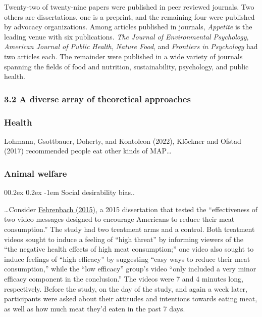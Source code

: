 \documentclass[
  man]{apa6}
\makeatletter
\let\oldparagraph\paragraph
\renewcommand{\paragraph}[1]{\oldparagraph{#1}\mbox{}}
\renewcommand{\paragraph}{\@startsection{paragraph}{4}{\parindent}%
  {0\baselineskip \@plus 0.2ex \@minus 0.2ex}%
  {-1em}%
  {\normalfont\normalsize\bfseries\itshape\typesectitle}}
\makeatother
\begin{document}
Twenty-two of twenty-nine papers were published in peer reviewed journals. Two others are dissertations, one is a preprint, and the remaining four were published by advocacy organizations. Among articles published in journals, \emph{Appetite} is the leading venue with six publications. \emph{The Journal of Environmental Psychology}, \emph{American Journal of Public Health}, \emph{Nature Food}, and \emph{Frontiers in Psychology} had two articles each. The remainder were published in a wide variety of journals spanning the fields of food and nutrition, sustainability, psychology, and public health.

\subsubsection{3.2 A diverse array of theoretical approaches}\label{a-diverse-array-of-theoretical-approaches}

\subsubsection{Health}\label{health}

Lohmann, Gsottbauer, Doherty, and Kontoleon (2022), Klöckner and Ofstad (2017) recommended people eat other kinds of MAP\ldots{}

\subsubsection{Animal welfare}\label{animal-welfare}

\paragraph{Social desirability bias..}\label{social-desirability-bias..}

\ldots Consider \href{https://www.proquest.com/docview/1712399091?fromopenview=true&pq-origsite=gscholar}{Fehrenbach (2015)}, a 2015 dissertation that tested the ``effectiveness of two video messages designed to encourage Americans to reduce their meat consumption.'' The study had two treatment arms and a control. Both treatment videos sought to induce a feeling of ``high threat'' by informing viewers of the ``the negative health effects of high meat consumption;'' one video also sought to induce feelings of ``high efficacy'' by suggesting ``easy ways to reduce their meat consumption,'' while the ``low efficacy'' group's video ``only included a very minor efficacy component in the conclusion.'' The videos were 7 and 4 minutes long, respectively. Before the study, on the day of the study, and again a week later, participants were asked about their attitudes and intentions towards eating meat, as well as how much meat they'd eaten in the past 7 days.
\end{document}
